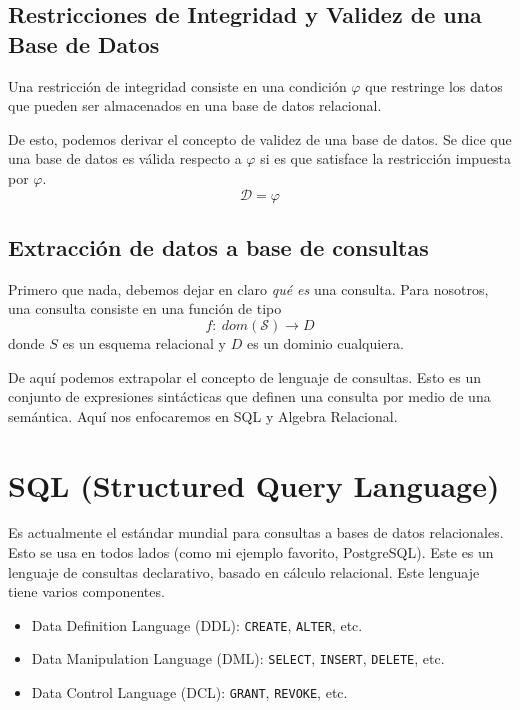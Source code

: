 
\subsection{Restricciones de Integridad y Validez de una Base de Datos}
Una restricción de integridad consiste en una condición $\varphi$ que restringe los datos que pueden ser almacenados en una base de datos relacional.

De esto, podemos derivar el concepto de validez de una base de datos. Se dice que una base de datos es válida respecto a $\varphi$ si es que satisface la restricción impuesta por $\varphi$.
\[ \mathcal{D} = \varphi \]

\subsection{Extracción de datos a base de consultas}
Primero que nada, debemos dejar en claro \textit{qué es} una consulta. Para nosotros, una consulta consiste en una función de tipo
\[ f:\ dom(\mathcal{S}) \rightarrow D \]
donde $S$ es un esquema relacional y $D$ es un dominio cualquiera.

De aquí podemos extrapolar el concepto de lenguaje de consultas. Esto es un conjunto de expresiones sintácticas que definen una consulta por medio de una semántica. Aquí nos enfocaremos en SQL y Algebra Relacional.

\section{SQL (Structured Query Language)}
Es actualmente el estándar mundial para consultas a bases de datos relacionales. Esto se usa en todos lados (como mi ejemplo favorito, PostgreSQL). Este es un lenguaje de consultas declarativo, basado en cálculo relacional. Este lenguaje tiene varios componentes.
\begin{itemize}
  \item Data Definition Language (DDL): \texttt{CREATE}, \texttt{ALTER}, etc.
  \item Data Manipulation Language (DML): \texttt{SELECT}, \texttt{INSERT}, \texttt{DELETE}, etc.
  \item Data Control Language (DCL): \texttt{GRANT}, \texttt{REVOKE}, etc.
\end{itemize}

